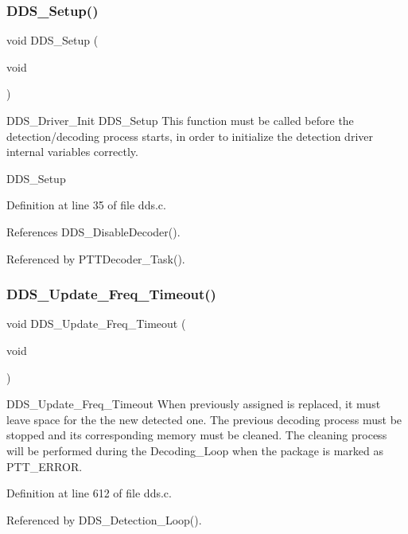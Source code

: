 \subsubsection{\texorpdfstring{D\+D\+S\+\_\+\+Setup()}{DDS\_Setup()}}
{\footnotesize\ttfamily void D\+D\+S\+\_\+\+Setup (\begin{DoxyParamCaption}\item[{void}]{ }\end{DoxyParamCaption})}

D\+D\+S\+\_\+\+Driver\+\_\+\+Init D\+D\+S\+\_\+\+Setup This function must be called before the detection/decoding process starts, in order to initialize the detection driver internal variables correctly.

D\+D\+S\+\_\+\+Setup 

Definition at line 35 of file dds.\+c.



References D\+D\+S\+\_\+\+Disable\+Decoder().



Referenced by P\+T\+T\+Decoder\+\_\+\+Task().

\mbox{\label{group___d_d_s_ga391db24a133ffa19533b5845c365367d}} 
\subsubsection{\texorpdfstring{D\+D\+S\+\_\+\+Update\+\_\+\+Freq\+\_\+\+Timeout()}{DDS\_Update\_Freq\_Timeout()}}
{\footnotesize\ttfamily void D\+D\+S\+\_\+\+Update\+\_\+\+Freq\+\_\+\+Timeout (\begin{DoxyParamCaption}\item[{void}]{ }\end{DoxyParamCaption})}

D\+D\+S\+\_\+\+Update\+\_\+\+Freq\+\_\+\+Timeout When previously assigned is replaced, it must leave space for the the new detected one. The previous decoding process must be stopped and its corresponding memory must be cleaned. The cleaning process will be performed during the Decoding\+\_\+\+Loop when the package is marked as P\+T\+T\+\_\+\+E\+R\+R\+OR.

Definition at line 612 of file dds.\+c.



Referenced by D\+D\+S\+\_\+\+Detection\+\_\+\+Loop().

